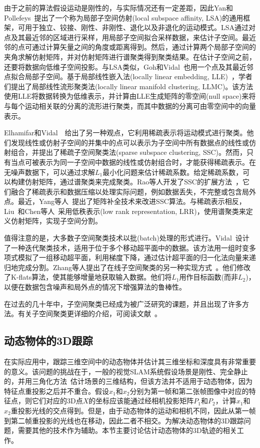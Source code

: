 由于之前的算法假设运动是刚性的，与实际情况还有一定差距，因此Yan和Pollefeys~\cite{yan2006general}提出了一个称为局部子空间仿射(local subspace affinity, LSA)的通用框架，可用于独立、铰接、刚性、非刚性、退化以及非退化的运动模式。LSA通过对点及其最近邻的区域进行采样，用局部子空间拟合采样数据，来估计子空间。最近邻的点可通过计算矢量之间的角度或距离得到。然后，通过计算两个局部子空间的夹角求解仿射矩阵，并对仿射矩阵进行谱聚类得到聚类结果。在估计子空间之前，还要将数据向低维子空间投影。与LSA类似，Goh和Vidal~\cite{goh2007segmenting}也用一个点及其最近邻点拟合局部子空间。基于局部线性嵌入法(locally linear embedding, LLE)~\cite{saul2003think}，学者们提出了局部线性流形聚类法(locally linear manifold clustering, LLMC)。该方法使用LLE将数据转换为低维表示，并计算由LLE生成矩阵的零空间(null space)来将与每个运动相关联的分离的流形进行聚类，而其中数据的分离可由零空间中的向量表示。

Elhamifar和Vidal~\cite{elhamifar2009sparse}~\cite{elhamifar2013sparse}给出了另一种观点，它利用稀疏表示将运动模式进行聚类。他们发现线性或仿射子空间的并集中的点可以表示为子空间中所有数据点的线性或仿射组合，并提出了稀疏子空间聚类法(sparse subspace clustering, SSC)。然而，只有当点可被表示为同一子空间中数据的线性或仿射组合时，才能获得稀疏表示。在无噪声数据下，可以通过求解$L_1$最小化问题来估计稀疏系数。给定稀疏系数，可以构建仿射矩阵，通过谱聚类来完成聚类。Rao等人开发了SSC的扩展方法~\cite{rao2009motion}，它们融合了稀疏表示和数据压缩以处理实际问题，例如数据丢失，不完整或包含局外点。最近，Yang等人~\cite{yang2015sparse}提出了矩阵补全技术来改进SSC算法。与稀疏表示相反，Liu~\cite{liu2012robust}和Chen等人~\cite{liu2010robust}采用低秩表示(low rank representation, LRR)，使用谱聚类来定义仿射矩阵，实现子空间分割。

值得注意的是，大多数子空间聚类技术以批(batch)处理的形式进行。Vidal~\cite{vidal2007online}设计了一种迭代聚类技术，适用于位于多个移动超平面中的数据。该方法用一组时变多项式模拟了一组移动超平面，利用梯度下降，通过估计超平面的归一化法向量来递归地完成分割。Zhang等人提出了在线子空间聚类的另一种实现方式~\cite{zhang2009median}。他们修改了K-flats算法，使其能够增量地获取输入数据。他们将$L_1$用作目标函数(而非$L_2$)，以便在数据包含噪声和局外点的情况下增强算法的鲁棒性。

在过去的几十年中，子空间聚类已经成为被广泛研究的课题，并且出现了许多方法。有关子空间聚类更详细的介绍，可阅读文献~\cite{vidal2011subspace}。

\subsection{动态物体的3D跟踪}
在实际应用中，跟踪三维空间中的动态物体并估计其三维坐标和深度具有非常重要的意义。该问题的挑战在于，一般的视觉SLAM系统假设场景是刚性、完全静止的，并用三角化方法~\cite{hartley1997triangulation}估计场景的三维结构，但该方法并不适用于动态物体，因为特征点重投影之后并不重合。假设$x_1$和$x_2$分别为第一帧和第二张帧图像中对应的特征点，则它们对应的3D点$X$的坐标应该能通过经相机投影矩阵$P_1$和$P_2$，计算$x_1$和$x_2$重投影光线的交点得到。但是，由于动态物体的运动和相机不同，因此从第一帧到第二帧重投影的光线也在移动，因此二者不相交。为解决动态物体的3D跟踪问题，需要其他的技术作为辅助。本节主要讨论估计动态物体的3D轨迹的相关工作。

